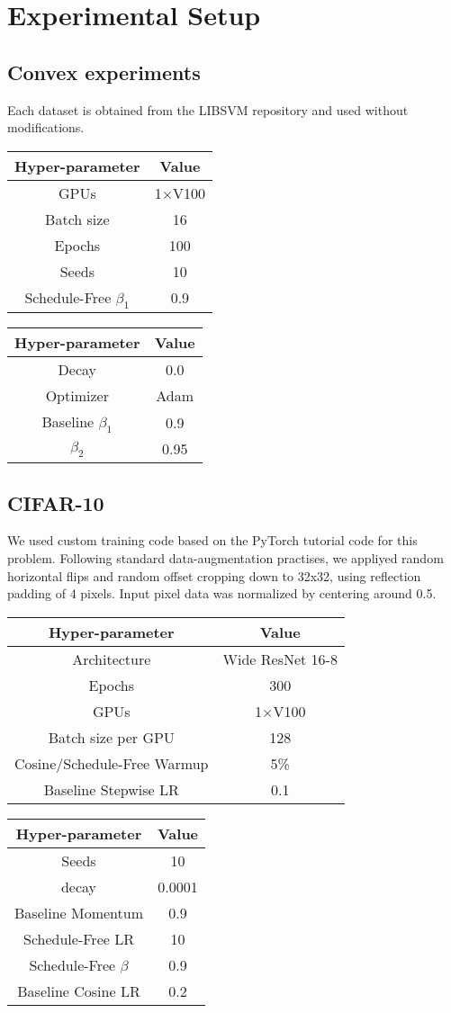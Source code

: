 \documentclass{article}
\begin{document}
\section{Experimental Setup}\label{sec:experiment_details}

\subsection{Convex experiments}
Each dataset is obtained from the LIBSVM repository and used without modifications. 

\begin{tabular}{|c|c|}
\hline
\textbf{Hyper-parameter}  & \textbf{Value}\tabularnewline
\hline 
GPUs  & 1$\times $V100\tabularnewline
\hline 
Batch size & 16\tabularnewline
\hline 
Epochs & 100\tabularnewline
\hline 
Seeds & 10\tabularnewline
\hline
Schedule-Free $\beta_1$ & 0.9 \tabularnewline
\hline
\end{tabular}
\quad
\begin{tabular}{|c|c|}
\hline
\textbf{Hyper-parameter}  & \textbf{Value}\tabularnewline
\hline 
Decay & 0.0\tabularnewline
\hline 
Optimizer & Adam \tabularnewline
\hline 
Baseline $\beta_1$ & 0.9 \tabularnewline
\hline 
$\beta_2$ & 0.95 \tabularnewline
\hline 
\end{tabular}


\subsection{CIFAR-10}
We used custom training code based on the PyTorch tutorial code for this problem. Following standard data-augmentation practises, we appliyed random horizontal flips and random offset cropping down to 32x32, using reflection padding of 4 pixels. Input pixel data was normalized by centering around 0.5.

\begin{tabular}[t]{|c|c|}
\hline 
\textbf{Hyper-parameter}  & \textbf{Value}\tabularnewline
\hline
Architecture  & Wide ResNet 16-8\tabularnewline
\hline 
Epochs  & 300\tabularnewline
\hline 
GPUs  & 1$\times $V100\tabularnewline
\hline 
Batch size per GPU  & 128\tabularnewline
\hline 
Cosine/Schedule-Free Warmup & 5\% \tabularnewline
\hline
Baseline Stepwise LR & 0.1 \tabularnewline
\hline
\end{tabular}
\quad
\begin{tabular}[t]{|c|c|}
\hline 
\textbf{Hyper-parameter}  & \textbf{Value}\tabularnewline
\hline 
Seeds & 10\tabularnewline
\hline 
decay & 0.0001\tabularnewline
\hline 
Baseline Momentum & 0.9\tabularnewline
\hline 
Schedule-Free LR & 10 \tabularnewline
\hline
Schedule-Free $\beta$ & 0.9 \tabularnewline
\hline
Baseline Cosine LR & 0.2 \tabularnewline
\hline
\end{tabular}
\end{document}
